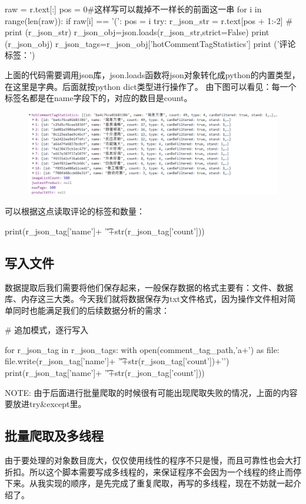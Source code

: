 \begin{python}
raw = r.text[:]
pos = 0#这样写可以裁掉不一样长的前面这一串
for i in range(len(raw)):
    if raw[i] == '(':
        pos = i
try:
    r_json_str = r.text[pos + 1:-2]
    # print (r_json_str)
    r_json_obj=json.loads(r_json_str,strict=False)
    print (r_json_obj)
    r_json_tags=r_json_obj['hotCommentTagStatistics']
    print ('评论标签：')
\end{python}
上面的代码需要调用json库，json.loads函数将json对象转化成python的内置类型，在这里是字典。后面就按python dict类型进行操作了。
由下图可以看见：每一个标签名都是在name字段下的，对应的数目是count。
\begin{figure}[htbp]
\centering
\includegraphics[width=13.5cm]{img/yhb/cmt_tags_eg_jd.png}
\end{figure}
可以根据这点读取评论的标签和数量：
\begin{python}
print(r_json_tag['name']+
                      '\t'+str(r_json_tag['count']))
\end{python}
\subsection{写入文件}
数据提取后我们需要将他们保存起来，一般保存数据的格式主要有：文件、数据库、内存这三大类。今天我们就将数据保存为txt文件格式，因为操作文件相对简单同时也能满足我们的后续数据分析的需求：
\begin{python}
# 追加模式，逐行写入

        for r_json_tag in r_json_tags:
            with open(comment_tag_path,'a+') as file:
                file.write(r_json_tag['name']+
                           '\t'+str(r_json_tag['count'])+'\n')
                print(r_json_tag['name']+
                      '\t'+str(r_json_tag['count']))
\end{python}
NOTE: 由于后面进行批量爬取的时候很有可能出现爬取失败的情况，上面的内容要放进try\&except里。

\subsection{批量爬取及多线程}
由于要处理的对象数目庞大，仅仅使用线性的程序不只是慢，而且可靠性也会大打折扣。所以这个脚本需要写成多线程的，来保证程序不会因为一个线程的终止而停下来。从我实现的顺序，是先完成了重复爬取，再写的多线程，现在不妨就一起介绍了。

